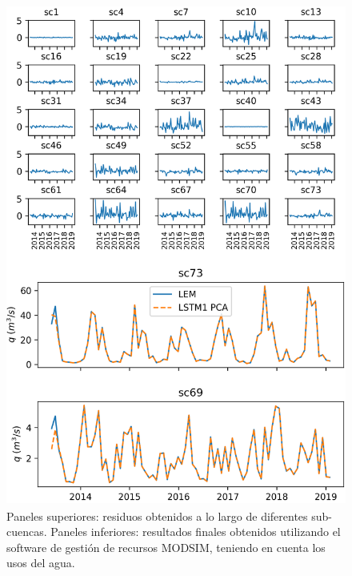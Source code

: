   \begin{figure}[h!]
    \begin{center}
      \includegraphics[height=6.5in]{Figures/modzim/comp_modzim.png}
      \caption{ Paneles superiores: residuos obtenidos a lo largo de diferentes sub-cuencas. 
      Paneles inferiores: resultados finales obtenidos utilizando el software de gestión de recursos MODSIM, teniendo en cuenta los usos del agua.}
      \label{modsim}
    \end{center}
  \end{figure}


